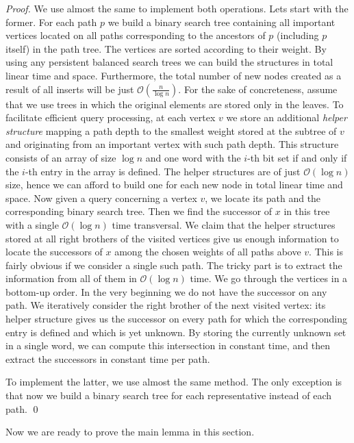 \documentclass[runningheads]{llncs}
\begin{document}
\begin{proof}
We use almost the same to implement both operations. Lets start with the former. For each path $p$ we build a binary search tree containing all important vertices located on all paths corresponding to the ancestors of $p$ (including $p$ itself) in the path tree. The vertices are sorted according to their weight. By using any persistent balanced search trees we can build the structures in total linear time and space. Furthermore, the total number of new nodes created as a result of all inserts will be just $\mathcal{O}(\frac{n}{\log n})$. For the sake of concreteness, assume that we use trees in which the original elements are stored only in the leaves. To facilitate efficient query processing, at each vertex $v$ we store an additional \emph{helper structure} mapping a path depth to the smallest weight stored at the subtree of $v$ and originating from an important vertex with such path depth. This structure consists of an array of size $\log n$ and one word with the $i$-th bit set if and only if the $i$-th entry in the array is defined. The helper structures are of just $\mathcal{O}(\log n)$ size, hence we can afford to build one for each new node in total linear time and space. Now given a query concerning a vertex $v$, we locate its path and the corresponding binary search tree. Then we find the successor of $x$ in this tree with a single $\mathcal{O}(\log n)$ time transversal. We claim that the helper structures stored at all right brothers of the visited vertices give us enough information to locate the successors of $x$ among the chosen weights of all paths above $v$. This is fairly obvious if we consider a single such path. The tricky part is to extract the information from all of them in $\mathcal{O}(\log n)$ time. We go through the vertices in a bottom-up order. In the very beginning we do not have the successor on any path. We iteratively consider the right brother of the next visited vertex: its helper structure gives us the successor on every path for which the corresponding entry is defined and which is yet unknown. By storing the currently unknown set in a single word, we can compute this intersection in constant time, and then extract the successors in constant time per path.

To implement the latter, we use almost the same method. The only exception is that now we build a binary search tree for each representative instead of each path.
\qed
\end{proof}

Now we are ready to prove the main lemma in this section.
\end{document}

